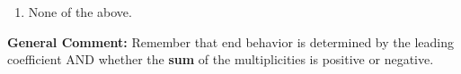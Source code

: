\documentclass{extbook}[14pt]
\begin{document}
\begin{enumerate}
{\begin{enumerate}[label=\Alph*.]
\item None of the above.\end{enumerate}
\textbf{General Comment:} Remember that end behavior is determined by the leading coefficient AND whether the \textbf{sum} of the multiplicities is positive or negative.
}
\end{enumerate}
\end{document}
